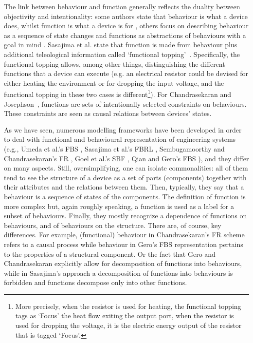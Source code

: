 \documentclass[sw]{iosart2x}
\newcommand{\quotes}[1]{`#1'}
\begin{document}
The link between behaviour and function generally reflects the duality between objectivity and intentionality: some authors state that behaviour is what a device does, whilst function is what a device is for \cite{kleer_qualitative_1984}, others focus on describing behaviour as a sequence of state changes and functions as abstractions of behaviours with a goal in mind \cite{umedaFunctionBehaviourStructure1990}.  
Sasajima et al. state that function is made from behaviour plus additional teleological information called \quotes{functional topping}~\cite{sasajimaFBRLFunctionBehavior1995, sasajimaInvestigationDomainOntology1994}.
Specifically, the functional topping allows, among other things, distinguishing the different functions that a device can execute (e.g. an electrical resistor could be devised for either heating the environment or for dropping the input voltage, and the functional topping in these two cases is different\footnote{More precisely, when the resistor is used for heating, the functional topping tags as `Focus' the heat flow exiting the output port, when the resistor is used for dropping the voltage, it is the electric energy output of the resistor that is tagged `Focus'.}).
For Chandrasekaran and Josephson~\cite{chandrasekaranFunctionDeviceRepresentation2000}, functions are sets of intentionally selected constraints on behaviours. These constraints are seen as causal relations between devices' states.


As we have seen, numerous modelling frameworks have been developed in order to deal with functional and behavioural representation of engineering systems (e.g., Umeda et al.'s FBS \cite{umedaFunctionBehaviourStructure1990}, Sasajima et al.'s FBRL \cite{sasajimaFBRLFunctionBehavior1995}, Sembugamoorthy and Chandrasekaran's FR \cite{sembugamoorthy1986functional}, Goel et al.'s SBF \cite{goelUseDesignPatterns2004}, Qian and Gero's FBS \cite{qianFunctionBehaviorStructure1996}), and they differ on many aspects. 
Still, oversimplifying, one can isolate commonalities: all of them tend to see the structure of a device as a set of parts (components) together with their attributes and the relations between them. Then, typically, they say that a behaviour is a sequence of states of the components. The definition of function is more  complex but, again roughly speaking, a function is used as a label for a subset of behaviours. Finally, they  mostly recognize a dependence of functions on behaviours, and of behaviours on the structure. 
There are, of course, key differences. 
For example, (functional) behaviour in Chandrasekaran’s FR scheme refers to a causal process while behaviour in Gero’s FBS representation pertains to the properties of a structural component.
Or the fact that Gero and Chandrasekaran explicitly allow for decomposition of functions into behaviours, while in Sasajima's approach a decomposition of functions into behaviours is forbidden and functions decompose only into other functions.  
\end{document}
